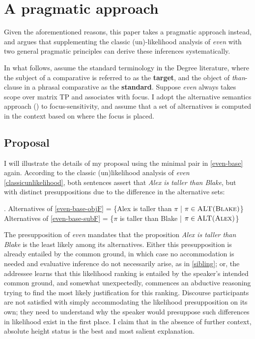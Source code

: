 \documentclass[12pt,letterpaper]{scrartcl}
\begin{document}
\section{A pragmatic approach}

Given the aforementioned reasons, this paper takes a pragmatic approach instead, and argues that supplementing the classic (un)-likelihood analysis of \textit{even} with two general pragmatic principles can derive these inferences systematically.

In what follows, assume the standard terminology in the Degree literature, where the subject of a comparative is referred to as the \textbf{target}, and the object of \textit{than}-clause in a phrasal comparative as the \textbf{standard}. Suppose \textit{even} always takes scope over matrix TP and associates with focus. I adopt the alternative semantics approach (\cite{rooth_association_1985}) to focus-sensitivity, and assume that a set of alternatives is computed in the context based on where the focus is placed.

\subsection{Proposal}

I will illustrate the details of my proposal using the minimal pair in \ref{even-base} again. According to the classic (un)likelihood analysis of \textit{even} \ref{classicunlikelihood}, both sentences assert that \textit{Alex is taller than Blake}, but with distinct presuppositions due to the difference in the alternative sets:

\ex. Alternatives of \ref{even-base-objF} =  \{Alex is taller than $\pi$ | $\pi \in \textsc{ALT(Blake)}$\} \\
Alternatives of \ref{even-base-subF} =  \{$\pi$ is taller than Blake | $\pi \in \textsc{ALT(Alex)}$\}


The presupposition of \textit{even} mandates that the proposition \textit{Alex is taller than Blake} is the least likely among its alternatives. Either this presupposition is already entailed by the common ground, in which case no accommodation is needed and evaluative inference do not necessarily arise, as in \ref{sibling}; or, the addressee learns that this likelihood ranking is entailed by the speaker's intended common ground, and somewhat unexpectedly, commences an abductive reasoning trying to find the most likely justification for this ranking. Discourse participants are not satisfied with simply accommodating the likelihood presupposition on its own; they need to understand why the speaker would presuppose such differences in likelihood exist in the first place. I claim that in the absence of further context, absolute height status is the best and most salient explanation.
\end{document}
